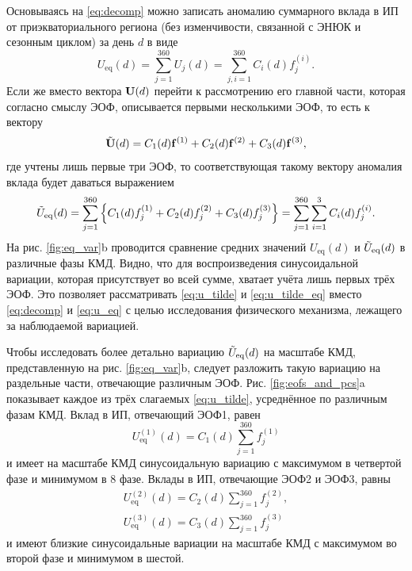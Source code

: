 Основываясь на \eqref{eq:decomp} можно записать аномалию суммарного вклада в ИП от приэкваториального региона (без изменчивости, связанной с ЭНЮК и сезонным циклом) за день $d$ в виде
\begin{equation}
\label{eq:u_eq}
    U_{\mathrm{eq}} (d) = \sum\limits_{j=1}^{360} U_j(d) = \sum\limits_{j,i=1}^{360} C_i(d) f_j^{(i)}.
\end{equation}
Если же вместо вектора $\vb{U}(d)$ перейти к рассмотрению его главной части, которая согласно смыслу ЭОФ, описывается первыми несколькими ЭОФ, то есть к вектору
\begin{equation}
\label{eq:u_tilde}
    \Tilde{\vb{U}}(d) = C_1(d) \vb{f}^{(1)} + C_2(d) \vb{f}^{(2)} + C_3(d) \vb{f}^{(3)},
\end{equation}
где учтены лишь первые три ЭОФ, то соответствующая такому вектору аномалия вклада будет даваться выражением
\begin{equation}
\label{eq:u_tilde_eq}
    \Tilde{U}_{\mathrm{eq}}(d) =\sum\limits_{j=1}^{360} \qty{C_1(d) {f}_j^{(1)} + C_2(d) {f}_j^{(2)} + C_3(d) {f}_j^{(3)}} = \sum\limits_{j=1}^{360} \sum\limits_{i=1}^{3} C_i(d) f_j^{(i)}.
\end{equation}
На рис. \ref{fig:eq_var}{b} проводится сравнение средних значений $U_{\mathrm{eq}} (d)$ и $\Tilde{U}_{\mathrm{eq}}(d)$ в различные фазы КМД. Видно, что для воспроизведения синусоидальной вариации, которая присутствует во всей сумме, хватает учёта лишь первых трёх ЭОФ. Это позволяет рассматривать \eqref{eq:u_tilde} и \eqref{eq:u_tilde_eq} вместо \eqref{eq:decomp} и \eqref{eq:u_eq} с целью исследования физического механизма, лежащего за наблюдаемой вариацией.

Чтобы исследовать более детально вариацию $\Tilde{U}_{\mathrm{eq}}(d)$ на масштабе КМД, представленную на рис. \ref{fig:eq_var}{b}, следует разложить такую вариацию на раздельные части, отвечающие различным ЭОФ. Рис. \ref{fig:eofs_and_pcs}{a} показывает каждое из трёх слагаемых \eqref{eq:u_tilde}, усреднённое по различным фазам КМД. Вклад в ИП, отвечающий ЭОФ1, равен
\begin{equation}
\label{eq:u1}
    U_\mathrm{eq}^{(1)} (d) = C_1(d) \sum\limits_{j=1}^{360} {f}_j^{(1)}
\end{equation}
и имеет на масштабе КМД синусоидальную вариацию с максимумом в четвертой фазе и минимумом в 8 фазе. Вклады в ИП, отвечающие ЭОФ2 и ЭОФ3, равны
\begin{equation}
\label{eq:u23}
    \begin{split}
        U_\mathrm{eq}^{(2)} (d) = C_2(d) \sum\limits_{j=1}^{360} {f}_j^{(2)},\\
        U_\mathrm{eq}^{(3)} (d) = C_3(d) \sum\limits_{j=1}^{360} {f}_j^{(3)}
    \end{split}
\end{equation}
и имеют близкие синусоидальные вариации на масштабе КМД с максимумом во второй фазе и минимумом в шестой.

